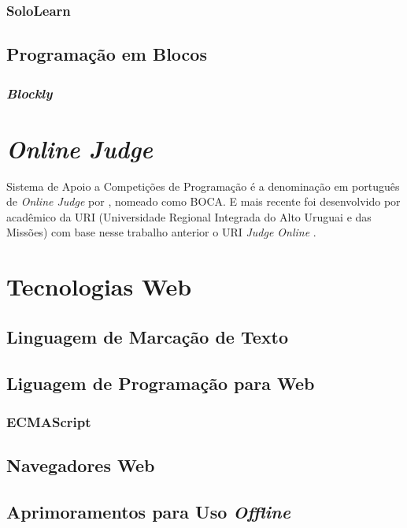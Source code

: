 \subsubsection{SoloLearn}

\subsection{Programação em Blocos}

\subsubsection{\textit{Blockly}}

\section{\textit{Online Judge}}

Sistema de Apoio a Competições de Programação é a denominação em português de
\textit{Online Judge} por , nomeado como BOCA.
E mais recente foi desenvolvido por acadêmico da URI (Universidade Regional
Integrada do Alto Uruguai e das Missões) com base nesse trabalho anterior o URI
\textit{Judge Online} \cite{tonin2012etal}.

\section{Tecnologias Web}

\subsection{Linguagem de Marcação de Texto}

\subsection{Liguagem de Programação para Web}

\subsubsection{ECMAScript}

\subsection{Navegadores Web}

\subsection{Aprimoramentos para Uso \textit{Offline}}

